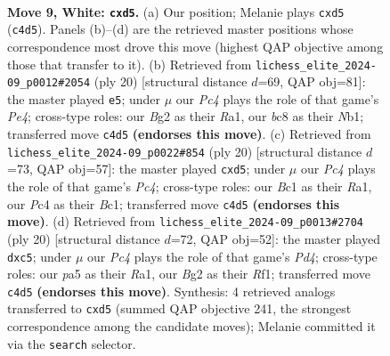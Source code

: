 \documentclass[11pt]{article}
\begin{document}
\clearpage

\begin{figure}[p]\centering
\begin{subfigure}{0.46\textwidth}\centering
\resizebox{\linewidth}{!}{%
\newchessgame
\chessboard[
  setfen={rnbq1rk1/1p2bp1p/4pnp1/p1pp4/P1P5/1P3NP1/3PPPBP/RNBQ1RK1 w - - 0 9},
  showmover=false,
  pgfstyle=straightmove, color=movearrow, markmove={c4-d5}
]}
\caption{}
\end{subfigure}\hfill
\begin{subfigure}{0.46\textwidth}\centering
\resizebox{\linewidth}{!}{%
\newchessgame
\chessboard[
  setfen={rn1q1rk1/1b2bppp/p3pn2/1ppp4/3PP3/2P2N2/PPB2PPP/RNBQR1K1 w - - 0 11},
  showmover=false,
  pgfstyle=straightmove, color=movearrow, markmove={e4-e5}
]}
\caption{}
\end{subfigure}
\\[4pt]
\begin{subfigure}{0.46\textwidth}\centering
\resizebox{\linewidth}{!}{%
\newchessgame
\chessboard[
  setfen={rnbq1rk1/1p2ppbp/2p2np1/3p4/2PP4/pPN2NP1/P3PPBP/R1BQ1RK1 w - - 0 11},
  showmover=false,
  pgfstyle=straightmove, color=movearrow, markmove={c4-d5}
]}
\caption{}
\end{subfigure}\hfill
\begin{subfigure}{0.46\textwidth}\centering
\resizebox{\linewidth}{!}{%
\newchessgame
\chessboard[
  setfen={rn1q1rk1/1p2bpp1/p3bn1p/2pp4/3P4/1PN2NP1/PB2PPBP/R2Q1RK1 w - - 2 11},
  showmover=false,
  pgfstyle=straightmove, color=movearrow, markmove={d4-c5}
]}
\caption{}
\end{subfigure}
\caption{\textbf{Move 9, White: \texttt{cxd5}.} (a) Our position; Melanie plays \texttt{cxd5} (\texttt{c4d5}). Panels (b)--(d) are the retrieved master positions whose correspondence most drove this move (highest QAP objective among those that transfer to it). (b) Retrieved from \texttt{lichess\_elite\_2024-09\_p0012\#2054} (ply 20) [structural distance $d$=69, QAP obj=81]: the master played \texttt{e5}; under $\mu$ our \emph{Pc4} plays the role of that game's \emph{Pe4}; cross-type roles: our \emph{B}g2 as their \emph{R}a1, our \emph{b}c8 as their \emph{N}b1; transferred move \texttt{c4d5} \textbf{(endorses this move)}. (c) Retrieved from \texttt{lichess\_elite\_2024-09\_p0022\#854} (ply 20) [structural distance $d$=73, QAP obj=57]: the master played \texttt{cxd5}; under $\mu$ our \emph{Pc4} plays the role of that game's \emph{Pc4}; cross-type roles: our \emph{B}c1 as their \emph{R}a1, our \emph{P}c4 as their \emph{B}c1; transferred move \texttt{c4d5} \textbf{(endorses this move)}. (d) Retrieved from \texttt{lichess\_elite\_2024-09\_p0013\#2704} (ply 20) [structural distance $d$=72, QAP obj=52]: the master played \texttt{dxc5}; under $\mu$ our \emph{Pc4} plays the role of that game's \emph{Pd4}; cross-type roles: our \emph{p}a5 as their \emph{R}a1, our \emph{B}g2 as their \emph{R}f1; transferred move \texttt{c4d5} \textbf{(endorses this move)}. Synthesis: 4 retrieved analogs transferred to \texttt{cxd5} (summed QAP objective 241, the strongest correspondence among the candidate moves); Melanie committed it via the \texttt{search} selector.}
\label{fig:thought-m16}
\end{figure}
\end{document}
